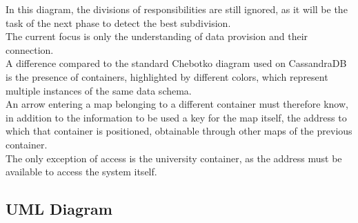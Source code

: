 \documentclass[ManualeSviluppatore]{subfiles}
\begin{document}
In this diagram, the divisions of responsibilities are still ignored, as it will be the task of the next phase to detect the best subdivision.\\
The current focus is only the understanding of data provision and their connection.\\

A difference compared to the standard Chebotko diagram used on CassandraDB is the presence of containers, highlighted by different colors, which represent multiple instances of the same data schema.\\
An arrow entering a map belonging to a different container must therefore know, in addition to the information to be used a key for the map itself, the address to which that container is positioned, obtainable through other maps of the previous container.\\
The only exception of access is the university container, as the address must be available to access the system itself.\\

\subsection{UML Diagram}
\end{document}
